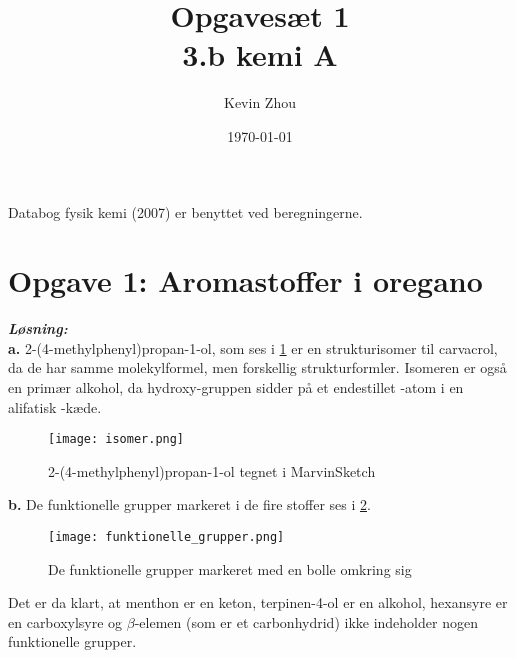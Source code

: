 \documentclass{report}
\title{Opgavesæt 1\\
{\Large \textbf{3.b kemi A}}}
\author{Kevin Zhou}
\date{\today}
\newcommand{\sol}{\setlength{\parindent}{0cm}\textbf{\textit{Løsning:}}\setlength{\parindent}{1cm}}
\begin{document}
\maketitle
\begin{note}
  Databog fysik kemi (2007) er benyttet ved beregningerne.
\end{note}
\section*{Opgave 1: Aromastoffer i oregano}
\sol \\
\textbf{a.}
2-(4-methylphenyl)propan-1-ol, som ses i \cref{fig:isomer} er en strukturisomer til carvacrol, da de har samme molekylformel, men forskellig strukturformler.
Isomeren er også en primær alkohol, da hydroxy-gruppen sidder på et endestillet -atom i en alifatisk -kæde.
\begin{figure}[H]
\begin{center}
  \texttt{[image: isomer.png]}
\end{center}
  \caption{2-(4-methylphenyl)propan-1-ol tegnet i MarvinSketch}
\label{fig:isomer}
\end{figure}
\textbf{b.}
De funktionelle grupper markeret i de fire stoffer ses i \cref{fig:funktionel}.
\begin{figure}[H]
\begin{center}
  \texttt{[image: funktionelle\_grupper.png]}
\end{center}
\caption{De funktionelle grupper markeret med en bolle omkring sig}
\label{fig:funktionel}
\end{figure}
Det er da klart, at menthon er en keton, terpinen-4-ol er en alkohol, hexansyre er en carboxylsyre og $\beta$-elemen (som er et carbonhydrid) ikke indeholder nogen funktionelle grupper.
\end{document}
